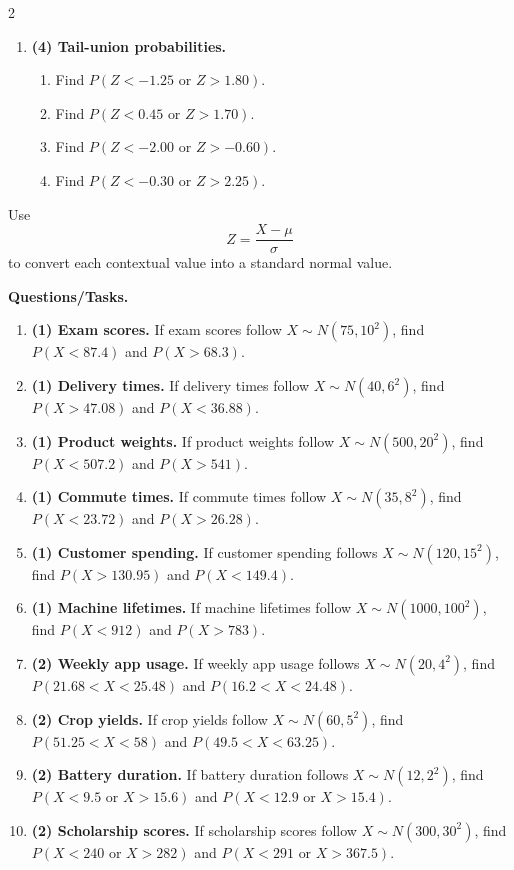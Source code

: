 \begin{multicols}{2}
\begin{enumerate}[label=\textbf{\alph*)}]
    \item \textbf{(4) Tail-union probabilities.}
    \begin{enumerate}[label=\textbf{\arabic*)}]
        \item Find \(P(Z<-1.25\text{ or }Z>1.80)\).
        \item Find \(P(Z<0.45\text{ or }Z>1.70)\).
        \item Find \(P(Z<-2.00\text{ or }Z>-0.60)\).
        \item Find \(P(Z<-0.30\text{ or }Z>2.25)\).
    \end{enumerate}
\end{enumerate}

\vspace{0.25cm}
\vspace{-0.25cm}

Use
\[
Z=\frac{X-\mu}{\sigma}
\]
to convert each contextual value into a standard normal value.

\textbf{Questions/Tasks.}
\begin{enumerate}[label=\textbf{\arabic*)}]
    \item \textbf{(1) Exam scores.} If exam scores follow \(X\sim N(75,10^2)\), find \(P(X<87.4)\) and \(P(X>68.3)\).
    \item \textbf{(1) Delivery times.} If delivery times follow \(X\sim N(40,6^2)\), find \(P(X>47.08)\) and \(P(X<36.88)\).
    \item \textbf{(1) Product weights.} If product weights follow \(X\sim N(500,20^2)\), find \(P(X<507.2)\) and \(P(X>541)\).
    \item \textbf{(1) Commute times.} If commute times follow \(X\sim N(35,8^2)\), find \(P(X<23.72)\) and \(P(X>26.28)\).
    \item \textbf{(1) Customer spending.} If customer spending follows \(X\sim N(120,15^2)\), find \(P(X>130.95)\) and \(P(X<149.4)\).
    \item \textbf{(1) Machine lifetimes.} If machine lifetimes follow \(X\sim N(1000,100^2)\), find \(P(X<912)\) and \(P(X>783)\).
    \item \textbf{(2) Weekly app usage.} If weekly app usage follows \(X\sim N(20,4^2)\), find \(P(21.68<X<25.48)\) and \(P(16.2<X<24.48)\).
    \item \textbf{(2) Crop yields.} If crop yields follow \(X\sim N(60,5^2)\), find \(P(51.25<X<58)\) and \(P(49.5<X<63.25)\).
    \item \textbf{(2) Battery duration.} If battery duration follows \(X\sim N(12,2^2)\), find \(P(X<9.5\text{ or }X>15.6)\) and \(P(X<12.9\text{ or }X>15.4)\).
    \item \textbf{(2) Scholarship scores.} If scholarship scores follow \(X\sim N(300,30^2)\), find \(P(X<240\text{ or }X>282)\) and \(P(X<291\text{ or }X>367.5)\).
\end{enumerate}


\end{multicols}
